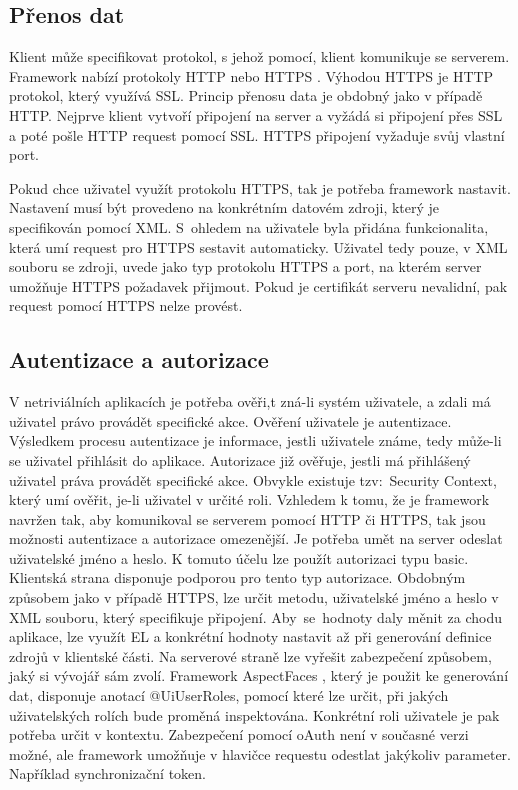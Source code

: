 \subsection{Přenos dat}
Klient může specifikovat protokol, s jehož pomocí, klient komunikuje se serverem. Framework nabízí protokoly HTTP nebo HTTPS \cite{https}. Výhodou HTTPS je HTTP protokol, který využívá SSL. Princip přenosu data je obdobný jako v případě HTTP. Nejprve klient vytvoří připojení na server a vyžádá si připojení přes SSL a poté pošle HTTP request pomocí SSL. HTTPS připojení vyžaduje svůj vlastní port. 

Pokud chce uživatel využít protokolu HTTPS, tak je potřeba framework nastavit. Nastavení musí být provedeno na konkrétním datovém zdroji, který je specifikován pomocí XML. S~ohledem na uživatele byla přidána funkcionalita, která umí request pro HTTPS sestavit automaticky. Uživatel tedy pouze, v XML souboru se zdroji, uvede jako typ protokolu HTTPS a port, na kterém server umožňuje HTTPS požadavek přijmout. Pokud je certifikát serveru nevalidní, pak request pomocí HTTPS nelze provést.

\subsection{Autentizace a autorizace}
V netriviálních aplikacích je potřeba ověři,t zná-li systém uživatele, a zdali má uživatel právo provádět specifické akce. Ověření uživatele je autentizace. Výsledkem procesu autentizace je informace, jestli uživatele známe, tedy může-li se uživatel přihlásit do aplikace. Autorizace již ověřuje, jestli má přihlášený uživatel práva provádět specifické akce. Obvykle existuje tzv:~Security Context, který umí ověřit, je-li uživatel v určité roli. Vzhledem k tomu, že je framework navržen tak, aby komunikoval se serverem pomocí HTTP či HTTPS, tak jsou možnosti autentizace a autorizace omezenější. Je potřeba umět na server odeslat uživatelské jméno a heslo. K tomuto účelu lze použít autorizaci typu basic. Klientská strana disponuje podporou pro tento typ autorizace. Obdobným způsobem jako v případě HTTPS, lze určit metodu, uživatelské jméno a heslo v XML souboru, který specifikuje připojení. Aby~se~hodnoty daly měnit za chodu aplikace, lze využít EL a konkrétní hodnoty nastavit až při generování definice zdrojů v klientské části. Na serverové straně lze vyřešit zabezpečení způsobem, jaký si vývojář sám zvolí. Framework AspectFaces \cite{aspectfaces}, který je použit ke generování dat, disponuje anotací @UiUserRoles, pomocí které lze určit, při jakých uživatelských rolích bude proměná inspektována. Konkrétní roli uživatele je pak potřeba určit v kontextu. Zabezpečení pomocí oAuth není v současné verzi možné, ale framework umožňuje v hlavičce requestu odestlat jakýkoliv parameter. Například synchronizační token. 

